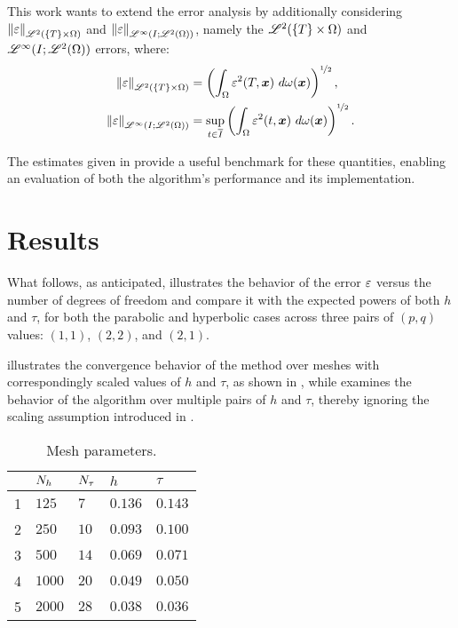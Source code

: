 This work wants to extend the error analysis by additionally considering $\left\lVert \varepsilon \right\rVert_{\mathscr{L}^{2}(\left\{ T \right\} \times \Omega)}$ and $\left\lVert \varepsilon \right\rVert_{\mathscr{L}^{\infty}(I; \mathscr{L}^{2}(\Omega))}$, namely the $\mathscr{L}^{2}(\left\{ T \right\} \times \Omega)$ and $\mathscr{L}^{\infty}(I; \mathscr{L}^{2}(\Omega))$ errors, where:
\begin{align}
    \left\lVert \varepsilon \right\rVert_{\mathscr{L}^{2}(\left\{ T \right\} \times \Omega)} &= \left( \int_{\Omega} \varepsilon^2(T, \bm{x}) ~ d \omega (\bm{x}) \right)^{\nicefrac12}, \\
    \left\lVert \varepsilon \right\rVert_{\mathscr{L}^{\infty}(I; \mathscr{L}^{2}(\Omega))} &= \sup_{t \in \overline{I}} \left( \int_{\Omega} \varepsilon^2(t, \bm{x}) ~ d \omega (\bm{x}) \right)^{\nicefrac12}. \label{eq:inf_error}
\end{align}

The estimates given in  provide a useful benchmark for these quantities, enabling an evaluation of both the algorithm's performance and its implementation.

\newpage
\section{Results}

What follows, as anticipated, illustrates the behavior of the error $\varepsilon$ versus the number of degrees of freedom and compare it with the expected powers of both $h$ and $\tau$, for both the parabolic and hyperbolic cases across three pairs of $\left( p, q \right)$ values: $\left( 1, 1 \right)$, $\left( 2, 2 \right)$, and $\left( 2, 1 \right)$.

 illustrates the convergence behavior of the method over meshes with correspondingly scaled values of $h$ and $\tau$, as shown in , while  examines the behavior of the algorithm over multiple pairs of $h$ and $\tau$, thereby ignoring the scaling assumption introduced in .

\begin{table}[!ht]
    \centering
    \def\arraystretch{1.25}
    \begin{tabular}{ | C{1cm} || C{2cm} | C{2cm} | C{2cm} | C{2cm} | }
        \hline
         & $N_h$ & $N_{\tau}$ & $h$ & $\tau$ \\
        \hline
         & $125$ & $7$ & $\num{0.136}$ & $\num{0.143}$ \\
        2 & $250$ & $10$ & $\num{0.093}$ & $\num{0.100}$ \\
        3 & $500$ & $14$ & $\num{0.069}$ & $\num{0.071}$ \\
        4 & $1000$ & $20$ & $\num{0.049}$ & $\num{0.050}$ \\
        5 & $2000$ & $28$ & $\num{0.038}$ & $\num{0.036}$ \\
        \hline
    \end{tabular}
    \caption{Mesh parameters.}
    \label{table:ht}
\end{table}

